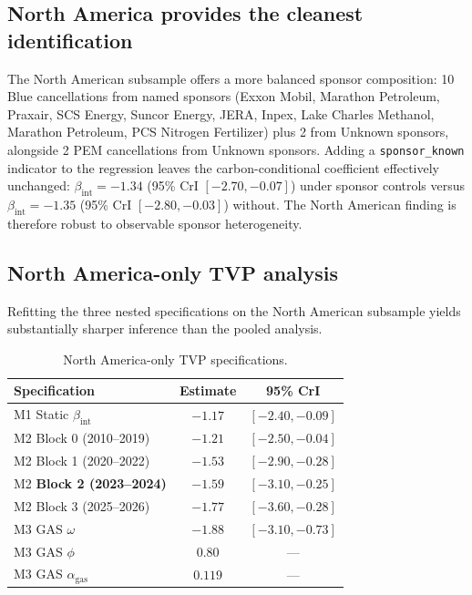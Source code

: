 \documentclass[11pt,a4paper]{article}
\newcommand{\bint}{\beta_{\mathrm{int}}}
\begin{document}
\subsection{North America provides the cleanest identification}

The North American subsample offers a more balanced sponsor composition: 10 Blue cancellations from named sponsors (Exxon Mobil, Marathon Petroleum, Praxair, SCS Energy, Suncor Energy, JERA, Inpex, Lake Charles Methanol, Marathon Petroleum, PCS Nitrogen Fertilizer) plus 2 from Unknown sponsors, alongside 2 PEM cancellations from Unknown sponsors. Adding a \texttt{sponsor\_known} indicator to the regression leaves the carbon-conditional coefficient effectively unchanged: $\bint = -1.34$ (95\% CrI $[-2.70, -0.07]$) under sponsor controls versus $\bint = -1.35$ (95\% CrI $[-2.80, -0.03]$) without. The North American finding is therefore robust to observable sponsor heterogeneity.

\subsection{North America-only TVP analysis}

Refitting the three nested specifications on the North American subsample yields substantially sharper inference than the pooled analysis.

\begin{table}[h!]
\centering
\caption{North America-only TVP specifications.}
\begin{tabular}{lcc}
\toprule
Specification & Estimate & 95\% CrI \\
\midrule
M1 Static $\bint$ & $-1.17$ & $[-2.40, -0.09]$ \\
M2 Block 0 (2010--2019) & $-1.21$ & $[-2.50, -0.04]$ \\
M2 Block 1 (2020--2022) & $-1.53$ & $[-2.90, -0.28]$ \\
M2 \textbf{Block 2 (2023--2024)} & $\mathbf{-1.59}$ & $\mathbf{[-3.10, -0.25]}$ \\
M2 Block 3 (2025--2026) & $-1.77$ & $[-3.60, -0.28]$ \\
M3 GAS $\omega$ & $-1.88$ & $[-3.10, -0.73]$ \\
M3 GAS $\phi$ & $0.80$ & --- \\
M3 GAS $\alpha_{\mathrm{gas}}$ & $0.119$ & --- \\
\bottomrule
\end{tabular}
\label{tab:ch7-na-tvp}
\end{table}
\end{document}
